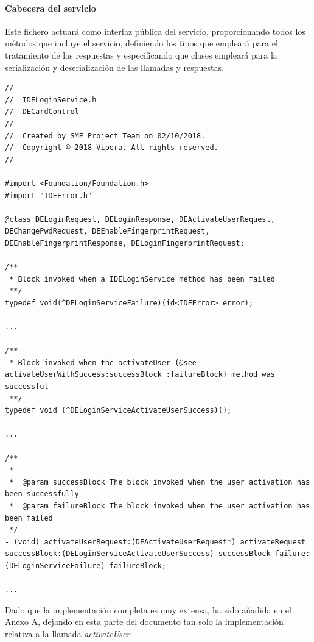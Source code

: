 \documentclass[a4paper, 12pt]{article}
\newenvironment{code}{\captionsetup{type=listing}}{}
\begin{document}
\paragraph{Cabecera del servicio}
\label{sec-4-2-3-1}
Este fichero actuará como interfaz pública del servicio, proporcionando todos los métodos que incluye el servicio, definiendo los tipos que empleará para el tratamiento de las respuestas y
especificando que clases empleará para la serialización y deserialización de las llamadas y respuestas.
\begin{code}
\label{code:ios-interface-partial}
\begin{verbatim}
//
//  IDELoginService.h
//  DECardControl
//
//  Created by SME Project Team on 02/10/2018.
//  Copyright © 2018 Vipera. All rights reserved.
//

#import <Foundation/Foundation.h>
#import "IDEError.h"

@class DELoginRequest, DELoginResponse, DEActivateUserRequest, DEChangePwdRequest, DEEnableFingerprintRequest, DEEnableFingerprintResponse, DELoginFingerprintRequest;

/**
 * Block invoked when a IDELoginService method has been failed
 **/
typedef void(^DELoginServiceFailure)(id<IDEError> error);

...

/**
 * Block invoked when the activateUser (@see -activateUserWithSuccess:successBlock :failureBlock) method was successful
 **/
typedef void (^DELoginServiceActivateUserSuccess)();

...

/**
 *
 *  @param successBlock The block invoked when the user activation has been successfully
 *  @param failureBlock The block invoked when the user activation has been failed
 */
- (void) activateUserRequest:(DEActivateUserRequest*) activateRequest successBlock:(DELoginServiceActivateUserSuccess) successBlock failure:(DELoginServiceFailure) failureBlock;

...

\end{verbatim}
\end{code}
\bigbreak
Dado que la implementación completa es muy extensa, ha sido añadida en el \hyperref[code:ios-interface]{Anexo A}, dejando en esta parte del documento tan solo la implementación relativa a la llamada
\emph{activateUser}.
\end{document}
